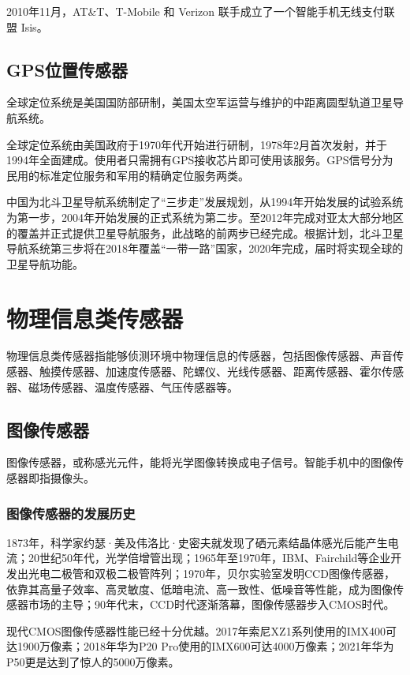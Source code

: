 \documentclass[lang=cn]{elegantpaper}
\begin{document}
2010年11月，AT\&T、T-Mobile 和 Verizon 联手成立了一个智能手机无线支付联盟 Isis。

\subsection{GPS位置传感器}

全球定位系统是美国国防部研制，美国太空军运营与维护的中距离圆型轨道卫星导航系统。

全球定位系统由美国政府于1970年代开始进行研制，1978年2月首次发射，并于1994年全面建成。使用者只需拥有GPS接收芯片即可使用该服务。GPS信号分为民用的标准定位服务和军用的精确定位服务两类。

中国为北斗卫星导航系统制定了“三步走”发展规划，从1994年开始发展的试验系统为第一步，2004年开始发展的正式系统为第二步。至2012年完成对亚太大部分地区的覆盖并正式提供卫星导航服务，此战略的前两步已经完成。根据计划，北斗卫星导航系统第三步将在2018年覆盖“一带一路”国家，2020年完成，届时将实现全球的卫星导航功能。


\section{物理信息类传感器}

物理信息类传感器指能够侦测环境中物理信息的传感器，包括图像传感器、声音传感器、触摸传感器、加速度传感器、陀螺仪、光线传感器、距离传感器、霍尔传感器、磁场传感器、温度传感器、气压传感器等。

\subsection{图像传感器}

图像传感器，或称感光元件，能将光学图像转换成电子信号。智能手机中的图像传感器即指摄像头。

\subsubsection{图像传感器的发展历史}

1873年，科学家约瑟·美及伟洛比·史密夫就发现了硒元素结晶体感光后能产生电流；20世纪50年代，光学倍增管出现；1965年至1970年，IBM、Fairchild等企业开发出光电二极管和双极二极管阵列；1970年，贝尔实验室发明CCD图像传感器，依靠其高量子效率、高灵敏度、低暗电流、高一致性、低噪音等性能，成为图像传感器市场的主导；90年代末，CCD时代逐渐落幕，图像传感器步入CMOS时代。

现代CMOS图像传感器性能已经十分优越。2017年索尼XZ1系列使用的IMX400可达1900万像素；2018年华为P20 Pro使用的IMX600可达4000万像素；2021年华为P50更是达到了惊人的5000万像素。
\end{document}
